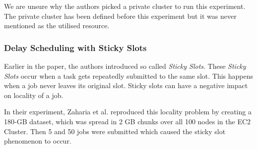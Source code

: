 We are unsure why the authors picked a private cluster to run this experiment. The private cluster has been defined before this experiment but it was never mentioned as the utilised resource.

\subsubsection{Delay Scheduling with Sticky Slots}

Earlier in the paper, the authors introduced so called \textit{Sticky Slots}. These \textit{Sticky Slots} occur when a task gets repeatedly submitted to the same slot. This happens when a job never leaves its original slot. Sticky slots can have a negative impact on locality of a job.

In their experiment, Zaharia et al. reproduced this locality problem by creating a 180-GB dataset, which was spread in 2 GB chunks over all 100 nodes in the EC2 Cluster. Then 5 and 50 jobs were submitted which caused the sticky slot phenomenon to occur.
